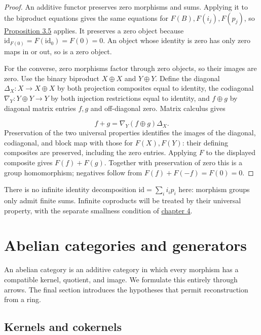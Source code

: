 \documentclass[11pt,a4paper]{article}
\theoremstyle{plain}
\theoremstyle{definition}
\begin{document}
\begin{proof}

An additive functor preserves zero morphisms and sums. Applying it to the biproduct equations gives the same equations for \(F(B),F(i_j),F(p_j)\), so \hyperref[env-3-5]{Proposition 3.5} applies. It preserves a zero object because \(\mathrm{id}_{F(0)}=F(\mathrm{id}_0)=F(0)=0\). An object whose identity is zero has only zero maps in or out, so is a zero object.


For the converse, zero morphisms factor through zero objects, so their images are zero. Use the binary biproduct \(X\oplus X\) and \(Y\oplus Y\). Define the diagonal \(\Delta_X:X\to X\oplus X\) by both projection composites equal to identity, the codiagonal \(\nabla_Y:Y\oplus Y\to Y\) by both injection restrictions equal to identity, and \(f\oplus g\) by diagonal matrix entries \(f,g\) and off-diagonal zero. Matrix calculus gives

\[f+g=\nabla_Y(f\oplus g)\Delta_X.\] 
Preservation of the two universal properties identifies the images of the diagonal, codiagonal, and block map with those for \(F(X),F(Y)\): their defining composites are preserved, including the zero entries. Applying \(F\) to the displayed composite gives \(F(f)+F(g)\). Together with preservation of zero this is a group homomorphism; negatives follow from \(F(f)+F(-f)=F(0)=0\).


\end{proof}
 
There is no infinite identity decomposition \(\mathrm{id}=\sum_i i_ip_i\) here: morphism groups only admit finite sums. Infinite coproducts will be treated by their universal property, with the separate smallness condition of \hyperref[chapter-04]{chapter 4}.

 
\section{Abelian categories and generators}
\label{chapter-04}
 
An abelian category is an additive category in which every morphism has a compatible kernel, quotient, and image. We formulate this entirely through arrows. The final section introduces the hypotheses that permit reconstruction from a ring.


\subsection{Kernels and cokernels}
\end{document}
